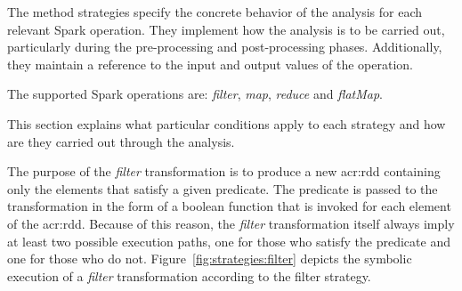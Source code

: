 \label{subsec:module:strategies}

The method strategies specify the concrete behavior of the analysis for each relevant Spark operation. They implement how the analysis is to be carried out, particularly during the pre-processing and post-processing phases. Additionally, they maintain a reference to the input and output values of the operation.

The supported Spark operations are: \textit{filter}, \textit{map}, \textit{reduce} and \textit{flatMap}.

This section explains what particular conditions apply to each strategy and how are they carried out through the analysis.


The purpose of the \textit{filter} transformation is to produce a new \acrshort{acr:rdd} containing only the elements that satisfy a given predicate. The predicate is passed to the transformation in the form of a boolean function that is invoked for each element of the \acrshort{acr:rdd}. Because of this reason, the \textit{filter} transformation itself always imply at least two possible execution paths, one for those who satisfy the predicate and one for those who do not. Figure~\ref{fig:strategies:filter} depicts the symbolic execution of a \textit{filter} transformation according to the filter strategy.

